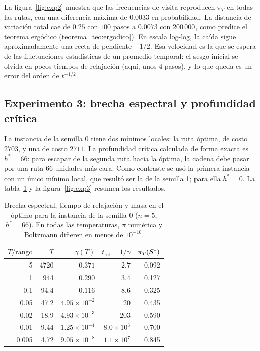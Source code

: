 La figura~\ref{fig:exp2} muestra que las frecuencias de visita
reproducen \(\pi_T\) en todas las rutas, con una diferencia máxima de
\(0.0033\) en probabilidad. La distancia de variación total cae de
\(0.25\) con \(100\) pasos a \(0.0073\) con \(200\,000\), como predice
el teorema ergódico (teorema~\ref{teo:ergodico}). En escala
log-log, la caída sigue aproximadamente una recta de pendiente
\(-1/2\). Esa velocidad es la que se espera de las fluctuaciones
estadísticas de un promedio temporal: el sesgo inicial se olvida en
pocos tiempos de relajación (aquí, unos \(4\) pasos), y lo que queda es
un error del orden de \(t^{-1/2}\).

\subsection{Experimento 3: brecha espectral y profundidad crítica}
\label{subsec:res_brecha}

La instancia de la semilla 0 tiene dos mínimos locales: la ruta óptima,
de costo \(2703\), y una de costo \(2711\). La profundidad crítica
calculada de forma exacta es \(h^\ast=66\): para escapar de la segunda
ruta hacia la óptima, la cadena debe pasar por una ruta \(66\) unidades
más cara. Como contraste se usó la primera instancia con un único
mínimo local, que resultó ser la de la semilla 1; para ella
\(h^\ast=0\). La tabla~\ref{tab:brecha} y la figura~\ref{fig:exp3}
resumen los resultados.

\begin{table}[H]
\centering
\small
\begin{tabular}{@{}rrrrr@{}}
\toprule
\(T/\text{rango}\) & \(T\) & \(\gamma(T)\) & \(t_{\mathrm{rel}}=1/\gamma\) & \(\pi_T(S^{\ast})\) \\
\midrule
5     & 4720 & \(0.371\) & \(2.7\) & 0.092 \\
1     &  944 & \(0.290\) & \(3.4\) & 0.127 \\
0.1   & 94.4 & \(0.116\) & \(8.6\) & 0.325 \\
0.05  & 47.2 & \(4.95\times10^{-2}\) & \(20\) & 0.435 \\
0.02  & 18.9 & \(4.93\times10^{-3}\) & \(203\) & 0.590 \\
0.01  & 9.44 & \(1.25\times10^{-4}\) & \(8.0\times10^{3}\) & 0.700 \\
0.005 & 4.72 & \(9.05\times10^{-8}\) & \(1.1\times10^{7}\) & 0.845 \\
\bottomrule
\end{tabular}
\caption{Brecha espectral, tiempo de relajación y masa en el óptimo
para la instancia de la semilla 0 (\(n=5\), \(h^\ast=66\)). En todas
las temperaturas, \(\pi\) numérica y Boltzmann difieren en menos de
\(10^{-10}\).}
\label{tab:brecha}
\end{table}

